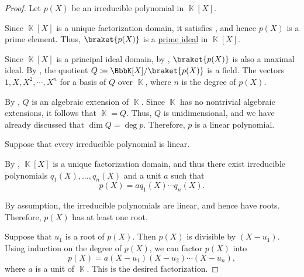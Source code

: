 \begin{proof}
   Let \( p(X) \) be an irreducible polynomial in \( \BbbK[X] \).

  Since \( \BbbK[X] \) is a unique factorization domain, it satisfies , and hence \( p(X) \) is a prime element. Thus, \( \braket {p(X)} \) is a \hyperref[def:semiring_ideal/prime]{prime ideal} in \( \BbbK[X] \).

  Since \( \BbbK[X] \) is a principal ideal domain, by , \( \braket{ p(X) } \) is also a maximal ideal. By , the quotient \( Q \coloneqq \BbbK[X] / \braket{ p(X) } \) is a field. The vectors \( 1, X, X^2, \cdots, X^n \) for a basis of \( Q \) over \( \BbbK \), where \( n \) is the degree of \( p(X) \).

  By , \( Q \) is an algebraic extension of \( \BbbK \). Since \( \BbbK \) has no nontrivial algebraic extensions, it follows that \( \BbbK = Q \). Thus, \( Q \) is unidimensional, and we have already discussed that \( \dim Q = \deg p \). Therefore, \( p \) is a linear polynomial.

   Suppose that every irreducible polynomial is linear.

  By , \( \BbbK[X] \) is a unique factorization domain, and thus there exist irreducible polynomials \( q_1(X), \ldots, q_n(X) \) and a unit \( a \) such that
  \begin{equation*}
    p(X) = a q_1(X) \cdots q_n(X).
  \end{equation*}

  By assumption, the irreducible polynomials are linear, and hence have roots. Therefore, \( p(X) \) has at least one root.

   Suppose that \( u_1 \) is a root of \( p(X) \). Then \( p(X) \) is divisible by \( (X - u_1) \). Using induction on the degree of \( p(X) \), we can factor \( p(X) \) into
  \begin{equation*}
    p(X) = a (X - u_1) (X - u_2) \cdots (X - u_n),
  \end{equation*}
  where \( a \) is a unit of \( \BbbK \). This is the desired factorization.


\end{proof}
